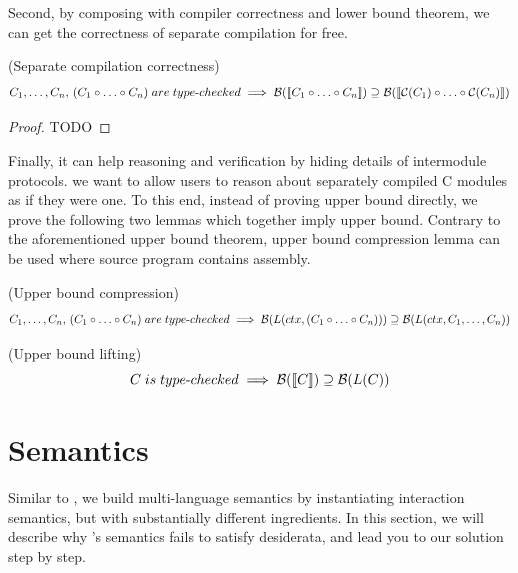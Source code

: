 {Second, by composing with compiler correctness and lower bound theorem, we can get the correctness of separate compilation for free.
\begin{corollary} (Separate compilation correctness)
  \[                            %
  C_{1}, \ldots, C_{n}, \, (C_{1} \circ \ldots \circ C_{n}) \; are \; type\mymathhyphen{}checked \implies
  \mathcal{B}(\llbracket C_{1} \circ \ldots \circ C_{n} \rrbracket) \supseteq \mathcal{B}(\llbracket \mathcal{C}(C_{1}) \circ \ldots \circ \mathcal{C}(C_{n}) \rrbracket)
  \]
\end{corollary}
\begin{proof}
  TODO
\end{proof}
Finally, it can help reasoning and verification by hiding details of intermodule protocols.
\ie{} we want to allow users to reason about separately compiled C modules as if they were one.
To this end, instead of proving upper bound directly, we prove the following two lemmas which together imply upper bound.
Contrary to the aforementioned upper bound theorem, upper bound compression lemma can be used where source program contains assembly.


\begin{lemma} (Upper bound compression)
  \[
  C_{1}, \ldots, C_{n}, \, (C_{1} \circ \ldots \circ C_{n}) \; are \; type{\hbox{-}}{}checked \implies
  \mathcal{B}(L(ctx, (C_{1} \circ \ldots \circ C_{n}))) \supseteq \mathcal{B}(L(ctx, C_{1}, \ldots, C_{n}))
  \]
\end{lemma}

\begin{lemma} (Upper bound lifting)
  \[
  C \; is \; type{\hbox{-}}{}checked \implies
  \mathcal{B}(\llbracket C \rrbracket) \supseteq \mathcal{B}(L(C))
  \]
\end{lemma}





\section{Semantics}\label{sec:overview:semantics}
Similar to \ccc{}, we build multi-language semantics by instantiating interaction semantics, but with substantially different ingredients.
In this section, we will describe why \ccc{}'s semantics fails to satisfy desiderata, and lead you to our solution step by step.

}
